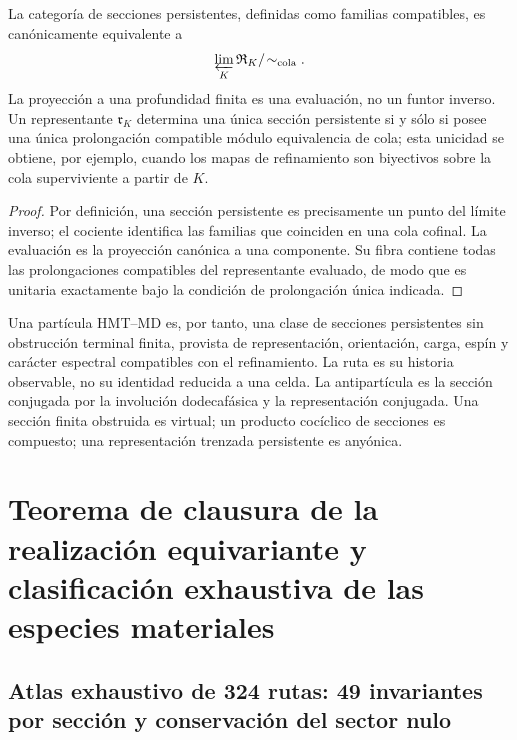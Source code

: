 \begin{theorem}
La categoría de secciones persistentes, definidas como familias compatibles,
es canónicamente equivalente a
\[
 \varprojlim_K\mathfrak R_K/\!\sim_{\rm cola}.
\]
La proyección a una profundidad finita es una evaluación, no un funtor inverso.
Un representante \(\mathfrak r_K\) determina una única sección persistente si
y sólo si posee una única prolongación compatible módulo equivalencia de cola;
esta unicidad se obtiene, por ejemplo, cuando los mapas de refinamiento son
biyectivos sobre la cola superviviente a partir de \(K\).
\end{theorem}

\begin{proof}
Por definición, una sección persistente es precisamente un punto del límite
inverso; el cociente identifica las familias que coinciden en una cola cofinal.
La evaluación es la proyección canónica a una componente. Su fibra contiene
todas las prolongaciones compatibles del representante evaluado, de modo que
es unitaria exactamente bajo la condición de prolongación única indicada.
\end{proof}

Una partícula HMT--MD es, por tanto, una clase de secciones persistentes sin
obstrucción terminal finita, provista de representación, orientación, carga,
espín y carácter espectral compatibles con el refinamiento. La ruta es su
historia observable, no su identidad reducida a una celda. La antipartícula
es la sección conjugada por la involución dodecafásica y la representación
conjugada. Una sección finita obstruida es virtual; un producto cocíclico de
secciones es compuesto; una representación trenzada persistente es anyónica.

\section{Teorema de clausura de la realización equivariante y clasificación exhaustiva de las especies materiales}

\subsection{Atlas exhaustivo de 324 rutas: 49 invariantes por sección y conservación del sector nulo}

